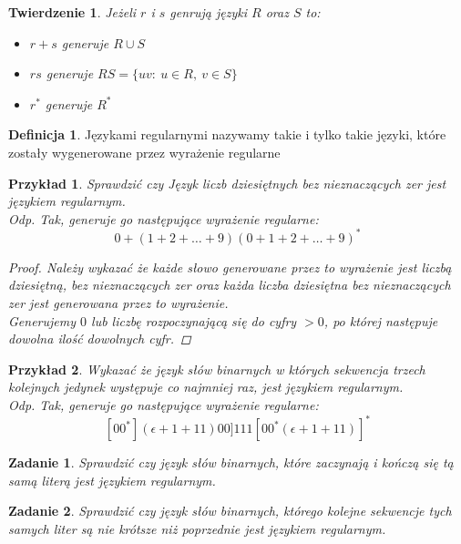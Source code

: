 \documentclass[12pt,a4paper]{article}
\newtheorem{tw}{Twierdzenie}
\newtheorem{przyklad}{Przykład}
\newtheorem{zad}{Zadanie}
\theoremstyle{definition}
\newtheorem{df}{Definicja}
\theoremstyle{remark}
\begin{document}
	\begin{tw}
		Jeżeli $r$ i $s$ genrują języki $R$ oraz $S$ to:
		\begin{itemize}
			\item $r+s$ generuje $R\cup S$
			\item $rs$ generuje $RS = \{uv: ~ u\in R, ~ v\in S\}$
			\item $r^*$ generuje $R^*$
		\end{itemize}
	\end{tw}
	
	\begin{df}
		Językami regularnymi nazywamy takie i tylko takie języki, które zostały wygenerowane przez wyrażenie regularne
	\end{df}	
	
	\begin{przyklad}
		Sprawdzić czy Język liczb dziesiętnych bez nieznaczących zer jest językiem regularnym. \\
		\emph{Odp.} Tak, generuje go następujące wyrażenie regularne:
		$$  0 + (1+2+\dots+9)(0+1+2+\dots+9)^* $$
		\begin{proof}
			Należy wykazać że każde słowo generowane przez to wyrażenie jest liczbą dziesiętną, bez nieznaczących zer oraz każda liczba 
			dziesiętna bez nieznaczących zer jest generowana przez to wyrażenie.\\
			Generujemy $0$ lub liczbę rozpoczynającą się do cyfry $> 0$, po której następuje dowolna ilość dowolnych cyfr.
		\end{proof}
	\end{przyklad}		
	
	\begin{przyklad}
		Wykazać że język słów binarnych w których sekwencja trzech kolejnych jedynek występuje co najmniej raz,
		jest językiem regularnym. \\
		\emph{Odp.} Tak, generuje go następujące wyrażenie regularne:
		$$[00^*](\epsilon+1+11)00]111[00^*(\epsilon+1+11)]^* $$
	\end{przyklad}
	
	\begin{zad}
		Sprawdzić czy język słów binarnych, które zaczynają i kończą się tą samą literą jest językiem regularnym.
	\end{zad}
	\begin{zad}
		Sprawdzić czy język słów binarnych, którego kolejne sekwencje tych samych liter są nie krótsze niż poprzednie jest językiem regularnym.
	\end{zad}
	
\end{document}
